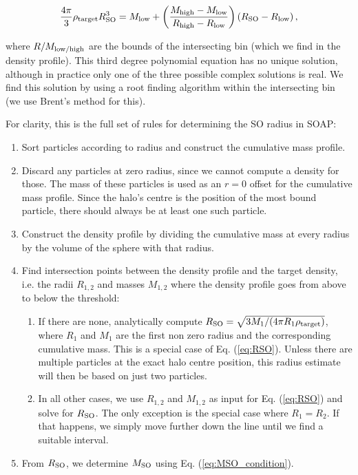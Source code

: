 \documentclass{article}
\begin{document}
\begin{equation}
    \frac{4\pi{}}{3} \rho{}_{\rm{}target} R_{\rm{}SO}^3 = M_{\rm{}low} + \left( \frac{M_{\rm{}high}-M_{\rm{}low}}{R_{\rm{}high} - R_{\rm{}low}} \right) \left(R_{\rm{}SO} - R_{\rm{}low}\right),
    \label{eq:RSO}
\end{equation}

where $R/M_{\rm{}low/high}$ are the bounds of the intersecting bin (which we find in the density profile). 
This third degree polynomial equation has no unique solution, although in practice only one of the three 
possible complex solutions is real. We find this solution by using a root finding algorithm within the 
intersecting bin (we use Brent's method for this).

For clarity, this is the full set of rules for determining the SO radius in SOAP:
\begin{enumerate}
    \item Sort particles according to radius and construct the cumulative mass profile.
    \item Discard any particles at zero radius, since we cannot compute a density for those. The mass of these 
    particles is used as an $r=0$ offset for the cumulative mass profile. Since the halo's centre is the 
    position of the most bound particle, there should always be at least one such particle.
    \item Construct the density profile by dividing the cumulative mass at every radius by the volume of the 
    sphere with that radius.
    \item Find intersection points between the density profile and the target density, i.e. the radii 
    $R_{1,2}$ and masses $M_{1,2}$ where the density profile goes from above to below the threshold:
    \begin{enumerate}
        \item If there are none, analytically compute $R_{\rm{}SO}=\sqrt{3M_1/(4\pi{}R_1\rho_{\rm{}target})}$, 
        where $R_1$ and $M_1$ are the first non zero radius and the corresponding cumulative mass. This is a 
        special case of Eq. (\ref{eq:RSO}). Unless there are multiple particles at the exact halo centre 
        position, this radius estimate will then be based on just two particles.
        \item In all other cases, we use $R_{1,2}$ and $M_{1,2}$ as input for Eq. (\ref{eq:RSO}) and solve for 
        $R_{\rm{}SO}$. The only exception is the special case where $R_1 = R_2$. If that happens, we simply 
        move further down the line until we find a suitable interval.

    \end{enumerate}
    \item From $R_{\rm{}SO}$, we determine $M_{\rm{}SO}$ using Eq. (\ref{eq:MSO_condition}).
\end{enumerate}
\end{document}
